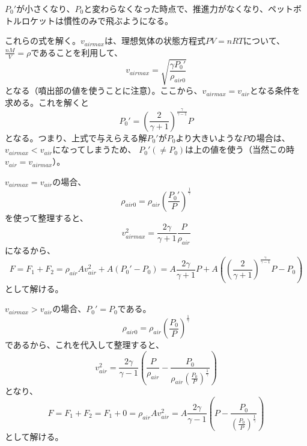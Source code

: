 \documentclass{article}
\begin{document}
$P_0'$が小さくなり、$P_0$と変わらなくなった時点で、推進力がなくなり、ペットボトルロケットは慣性のみで飛ぶようになる。

これらの式を解く。$v_{airmax}$は、理想気体の状態方程式$P V = n R T$について、$\frac{n M}{V} = \rho$であることを利用して、
\begin{equation}
v_{airmax} = \sqrt{\frac{\gamma P_0'}{\rho_{air0}}}
\end{equation}
となる（噴出部の値を使うことに注意）。ここから、$v_{airmax} = v_{air}$となる条件を求める。これを解くと
\begin{equation}
P_0'=\left(\frac{2}{\gamma+1}\right)^{\frac{\gamma}{\gamma-1}}P
\end{equation}
となる。つまり、上式で与えらえる解$P_0'$が$P_0$より大きいような$P$の場合は、$v_{airmax} < v_{air}$になってしまうため、
$P_0'(\neq P_0)$は上の値を使う（当然この時$v_{air} = v_{airmax}$）。

$v_{airmax} = v_{air}$の場合、
\begin{equation}
\rho_{air0} = \rho_{air} \left(\frac{P_0'}{P}\right)^{\frac{1}{\gamma}}
\end{equation}
を使って整理すると、
\begin{equation}
v_{airmax}^2 =  \frac{2 \gamma} {\gamma + 1} \frac{P}{\rho_{air}}
\end{equation}
になるから、
\begin{equation}
F=F_1+F_2=\rho_{air} A v_{air}^2 + A (P_0' - P_0) = A \frac{2 \gamma} {\gamma + 1} P + A \left(\left(\frac{2}{\gamma+1}\right)^{\frac{\gamma}{\gamma-1}}P - P_0  \right)
\end{equation}
として解ける。

$v_{airmax} > v_{air}$の場合、$P_0'=P_0$である。
\begin{equation}
\rho_{air0} = \rho_{air} \left(\frac{P_0}{P}\right)^{\frac{1}{\gamma}}
\end{equation}
であるから、これを代入して整理すると、
\begin{equation}
v_{air}^2 = \frac{2 \gamma}{\gamma -1}\left(\frac{P}{\rho_{air}} - \frac{P_0}{\rho_{air} \left( \frac{P_0}{P} \right)^{\frac{1}{\gamma}}} \right)
\end{equation}
となり、
\begin{equation}
F=F_1+F_2=F_1+0=\rho_{air} A v_{air}^2 = A \frac{2 \gamma}{\gamma -1}\left(P - \frac{P_0}{\left( \frac{P_0}{P} \right)^{\frac{1}{\gamma}}} \right)
\end{equation}
として解ける。

\end{document}
